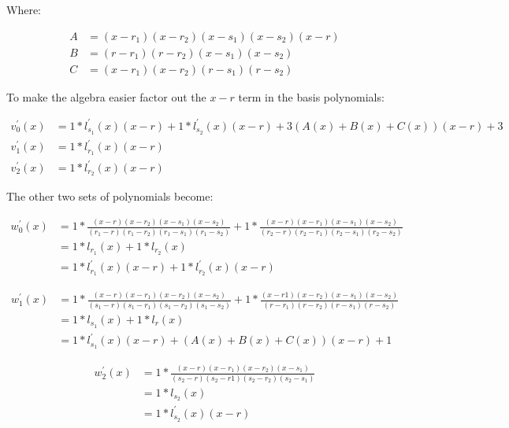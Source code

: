\documentclass{article}
\begin{document}
\noindent Where:

\begin{align*}
    A &= (x - r_{1}) (x - r_{2}) (x - s_{1}) (x - s_{2}) (x - r) \\
    B &= (r - r_{1}) (r - r_{2}) (x - s_{1}) (x - s_{2}) \\
    C &= (x - r_{1}) (x - r_{2}) (r - s_{1}) (r - s_{2})
\end{align*}

\noindent To make the algebra easier factor out the $ x - r $ term in the basis polynomials:

\begin{align*}
    v^{'}_{0}(x) &= 1 * l^{'}_{s_{1}}(x) (x - r) + 1 * l^{'}_{s_{2}}(x) (x - r) + 3 (A(x) + B(x) + C(x)) (x - r) + 3 \\
    v^{'}_{1}(x) &= 1 * l^{'}_{r_{1}}(x) (x - r) \\
    v^{'}_{2}(x) &= 1 * l^{'}_{r_{2}}(x) (x - r)
\end{align*}

\noindent The other two sets of polynomials become:

\begin{align*}
    w^{'}_{0}(x) &= 1 * \frac{(x  -  r) (x  - r_{2}) (x  - s_{1}) (x  - s_{2})}{(r_{1} -  r) (r_{1} - r_{2}) (r_{1} - s_{1}) (r_{1} - s_{2})} + 1 * \frac{(x  -  r) (x  - r_{1}) (x  - s_{1}) (x  - s_{2})}{(r_{2} -  r) (r_{2} - r_{1}) (r_{2} - s_{1}) (r_{2} - s_{2})} \\
    &= 1 * l_{r_{1}}(x) + 1 * l_{r_{2}}(x) \\
    &= 1 * l^{'}_{r_{1}}(x) (x - r) + 1 * l^{'}_{r_{2}}(x) (x - r)
\end{align*}

\begin{align*}
    w^{'}_{1}(x) &= 1 * \frac{(x  -  r) (x  - r_{1}) (x  - r_{2}) (x  - s_{2})}{(s_{1} -  r) (s_{1} - r_{1}) (s_{1} - r_{2}) (s_{1} - s_{2})} + 1 * \frac{(x  - r1) (x  - r_{2}) (x  - s_{1}) (x  - s_{2})}{(r  - r_{1}) (r  - r_{2}) (r  - s_{1}) (r  - s_{2})} \\
    &= 1 * l_{s_{1}}(x) + 1 * l_{r}(x) \\
    &= 1 * l^{'}_{s_{1}}(x) (x - r) + (A(x) + B(x) + C(x)) (x - r) + 1
\end{align*}

\begin{align*}
    w^{'}_{2}(x) &= 1 * \frac{(x  -  r) (x  - r_{1}) (x  - r_{2}) (x  - s_{1})}{(s_{2} -  r) (s_{2} - r1) (s_{2} - r_{2}) (s_{2} - s_{1})} \\
    &= 1 * l_{s_{2}}(x) \\
    &= 1 * l^{'}_{s_{2}}(x) (x - r)
\end{align*}
\end{document}
